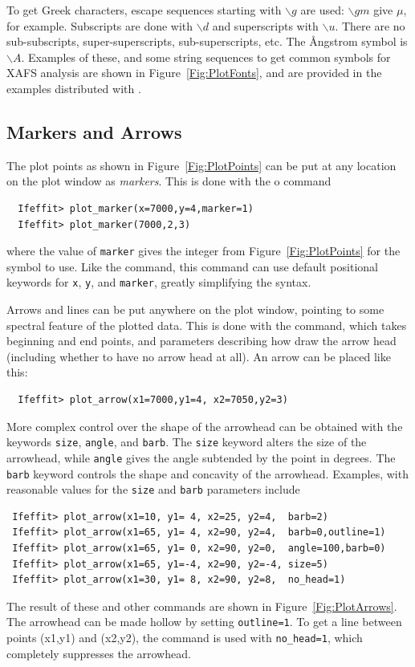 To get Greek characters, escape sequences starting with
${\mathtt{\backslash}{g}}$ are used: ${\mathtt{\backslash}{gm}}$ give
$\mu$, for example.  Subscripts are done with ${\mathtt{\backslash}d}$ and
superscripts with ${\mathtt{\backslash}u}$.  There are no sub-subscripts,
super-superscripts, sub-superscripts, etc.  The {\AA}ngstrom symbol is
${\mathtt{\backslash}A}$.  Examples of these, and some string sequences to
get common symbols for XAFS analysis are shown in
Figure~\ref{Fig:PlotFonts}, and are provided in the examples distributed
with {\ifeffit}.

\subsection{Markers and  Arrows} \label{Ch:Plot-Markers}

The plot points as shown in Figure~\ref{Fig:PlotPoints} can be put at any
location on the plot window as {\emph{markers}}.  This is done with the
o{} command
\begin{verbatim}
  Ifeffit> plot_marker(x=7000,y=4,marker=1)
  Ifeffit> plot_marker(7000,2,3)
\end{verbatim}
\noindent
where the value of {\tt{marker}} gives the integer from
Figure~\ref{Fig:PlotPoints} for the symbol to use.  Like the
{} command, this command can use default positional
keywords for {\tt{x}}, {\tt{y}}, and {\tt{marker}}, greatly simplifying the
syntax.  {}


{}

Arrows and lines can be put anywhere on the plot window, pointing to some
spectral feature of the plotted data.  This is done with the
{} command, which takes beginning and end points, and
parameters describing how draw the arrow head (including whether to have no
arrow head at all).  An arrow can be placed like this:
\begin{verbatim}
  Ifeffit> plot_arrow(x1=7000,y1=4, x2=7050,y2=3)
\end{verbatim}
\noindent
More complex control over the shape of the arrowhead can be obtained with
the keywords {\tt{size}}, {\tt{angle}}, and {\tt{barb}}.  The {\tt{size}}
keyword alters the size of the arrowhead, while {\tt{angle}} gives the
angle subtended by the point in degrees.  The {\tt{barb}} keyword controls
the shape and concavity of the arrowhead. Examples, with reasonable values
for the {\tt{size}} and {\tt{barb}} parameters include
\begin{verbatim}
 Ifeffit> plot_arrow(x1=10, y1= 4, x2=25, y2=4,  barb=2)
 Ifeffit> plot_arrow(x1=65, y1= 4, x2=90, y2=4,  barb=0,outline=1)
 Ifeffit> plot_arrow(x1=65, y1= 0, x2=90, y2=0,  angle=100,barb=0)
 Ifeffit> plot_arrow(x1=65, y1=-4, x2=90, y2=-4, size=5)
 Ifeffit> plot_arrow(x1=30, y1= 8, x2=90, y2=8,  no_head=1)
\end{verbatim}
\noindent
The result of these and other {} commands are shown in
Figure~\ref{Fig:PlotArrows}.  The arrowhead can be made hollow by setting
{\tt{outline=1}}.  To get a line between points (x1,y1) and (x2,y2), the
{} command is used with {\tt{no\_head=1}},
which completely suppresses the arrowhead.

